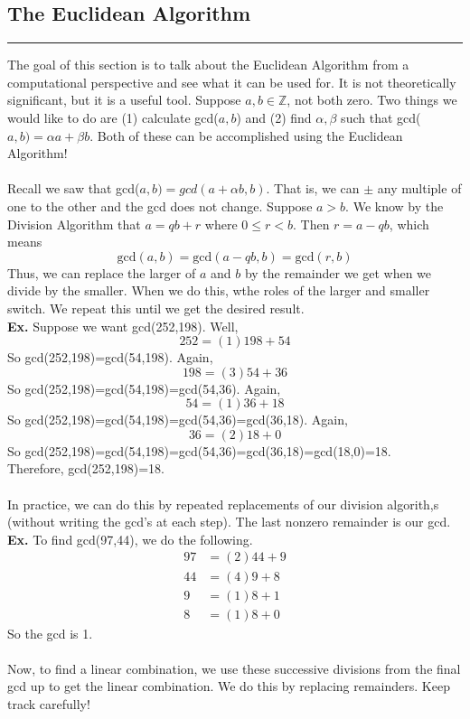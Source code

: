 \documentclass[class=article, crop=false]{standalone}
\def\integers{{\mathbb Z}}
\begin{document}
\subsection{The Euclidean Algorithm}
\rule{\textwidth}{1pt}
The goal of this section is to talk about the Euclidean Algorithm from a computational perspective and see what it can
be used for. It is not theoretically significant, but it is a useful tool. Suppose $a,b\in\integers$, not both
zero. Two things we would like to do are (1) calculate gcd($a,b$) and (2) find $\alpha, \beta$ such that 
gcd($a,b) = \alpha a+ \beta b$. Both of these can be accomplished using the Euclidean Algorithm!\\\\
Recall we saw that gcd($a,b)=gcd(a+\alpha b, b)$. That is, we can $\pm$ any multiple of one to the other
and the gcd does not change. Suppose $a>b$. We know by the Division Algorithm that $a=qb+r$ where $0\leq r<b$.
Then $r=a-qb$, which means $$\text{gcd}(a,b)=\text{gcd}(a-qb, b)=\text{gcd}(r,b)$$
Thus, we can replace the larger of $a$ and $b$ by the remainder we get when we divide by the smaller.
When we do this, wthe roles of the larger and smaller switch. We repeat this until we get the desired result.\\
\textbf{Ex.} Suppose we want gcd(252,198). Well, $$252=(1)198 + 54$$ So gcd(252,198)=gcd(54,198). Again,
$$198=(3)54 + 36$$ So gcd(252,198)=gcd(54,198)=gcd(54,36). Again,
$$54 = (1)36+18$$ So gcd(252,198)=gcd(54,198)=gcd(54,36)=gcd(36,18). Again,
$$36=(2)18+0$$ So gcd(252,198)=gcd(54,198)=gcd(54,36)=gcd(36,18)=gcd(18,0)=18.\\
Therefore, gcd(252,198)=18.\\\\
In practice, we can do this by repeated replacements of our division algorith,s (without writing the gcd's at
each step). The last nonzero remainder is our gcd.\\
\textbf{Ex.} To find gcd(97,44), we do the following.
\begin{align*}
	97 &= (2)44 +9\\
	44 &= (4)9 +8\\
	9 &= (1)8 +1\\
	8 &= (1)8 + 0
\end{align*}
So the gcd is 1.\\\\
Now, to find a linear combination, we use these successive divisions from the final gcd up to get the linear
combination. We do this by replacing remainders. Keep track carefully!\\
\end{document}
